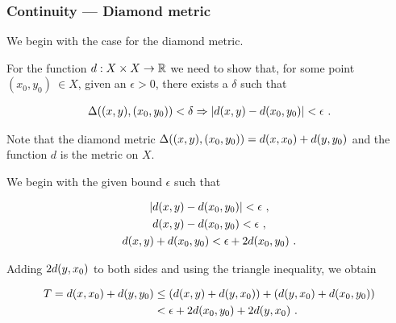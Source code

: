 \begin{frame}
    \frametitle{Continuity --- Diamond metric}

    We begin with the case for the
    diamond metric.

    \pause

    For the function \(d: X\times X \to \mathbb{R}\) we need to show that, for some point \((x_0, y_0)\ \in X \),
    given an \(\epsilon > 0\), there exists a \(\delta\) such that 

    \begin{gather}
        \Delta((x, y), (x_0, y_0)) < \delta \Rightarrow |d(x, y) - d(x_0, y_0)| < \epsilon~.
    \end{gather}

    Note that the diamond metric \(\Delta((x, y), (x_0, y_0)) = d(x, x_0) + d(y, y_0)\)
    and the function \(d\) is the metric on \(X\).

    
\end{frame}

\begin{frame}
    We begin with the given bound \(\epsilon\) such that

    \begin{gather}
        |d(x, y) - d(x_0, y_0)| < \epsilon~, \nonumber\\
        d(x, y) - d(x_0, y_0) < \epsilon~, \nonumber\\
        d(x, y) +d(x_0, y_0)< \epsilon + 2d(x_0, y_0)~.
    \end{gather}

    \pause

    Adding \(2d(y, x_0)\) to both sides and using the triangle inequality,
    we obtain

    \begin{tcolorbox}[colframe=red, colback=red!10!white]
        \begin{align}
            T = d(x, x_0) + d(y, y_0) &\leq (d(x, y) + d(y, x_0)) + (d(y, x_0)+d(x_0, y_0)) \nonumber\\ 
            &< \epsilon + 2d(x_0, y_0) + 2d(y, x_0)~.
            \label{eqn:tresult}
        \end{align}
    \end{tcolorbox}

\end{frame}

